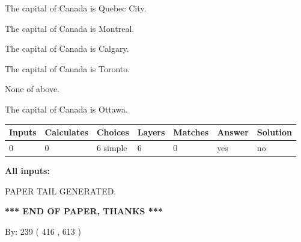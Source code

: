 \documentclass[12pt]{article}
\begin{document}
 
The capital of Canada is Quebec City.
 
 
The capital of Canada is Montreal.
 
 
The capital of Canada is Calgary.
 
 
The capital of Canada is Toronto.
 
 
 None of above.
 
 
\noindent{}
 
 
The capital of Canada is Ottawa.
 
 
\noindent{}
 
 
   
   
   
   
\noindent\begin{tabular}{|l|l|l|l|l|l|l|}
 \hline
Inputs & Calculates & Choices & Layers & Matches & Answer & Solution \\ \hline
 0  & 
 0  & 
 6
  simple  
  & 
 6  & 
 0  & 
  yes & 
  no 
  \\ \hline
 \end{tabular}
   
   
   
   
\noindent{}
   
   
   
   
\noindent\vspace{0.1in}\hspace{-0.08in} {\textbf{\Large{All inputs: }}}
   
   
   
   
   
   
 \vspace{0.2in}
 
   
   
\vspace{2.0in} PAPER TAIL GENERATED.
   
   
   
   
\vspace{1.0in} 
{\textbf{\large{ *** END OF PAPER, THANKS *** }}} 
   
   
\hspace{1.0in} By: 
 239 ( 416 ,  613 )
   
\end{document}
